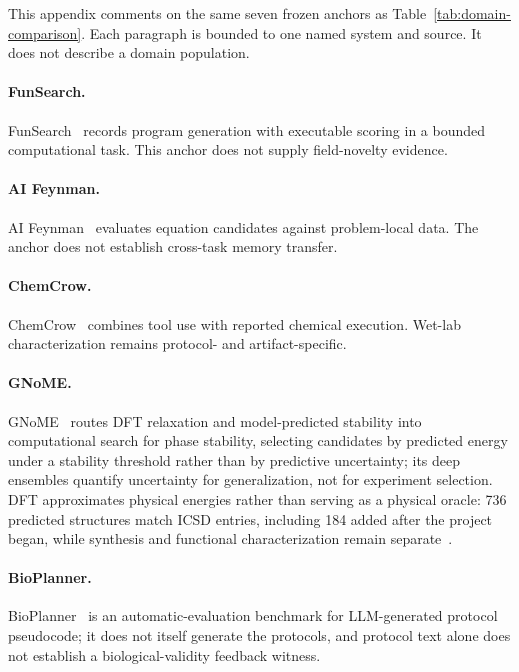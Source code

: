\documentclass{article}
\begin{document}
This appendix comments on the same seven frozen anchors as Table~\ref{tab:domain-comparison}. Each paragraph is bounded to one named system and source. It does not describe a domain population.

\paragraph{FunSearch.} FunSearch~\citep{romera2023funsearch} records program generation with executable scoring in a bounded computational task. This anchor does not supply field-novelty evidence.

\paragraph{AI Feynman.} AI Feynman~\citep{udrescu2020afeynman} evaluates equation candidates against problem-local data. The anchor does not establish cross-task memory transfer.

\paragraph{ChemCrow.} ChemCrow~\citep{bran2023chemcrow} combines tool use with reported chemical execution. Wet-lab characterization remains protocol- and artifact-specific.

\paragraph{GNoME.} GNoME~\citep{merchant2023gnome} routes DFT relaxation and model-predicted stability into computational search for phase stability, selecting candidates by predicted energy under a stability threshold rather than by predictive uncertainty; its deep ensembles quantify uncertainty for generalization, not for experiment selection. DFT approximates physical energies rather than serving as a physical oracle: 736 predicted structures match ICSD entries, including 184 added after the project began, while synthesis and functional characterization remain separate~\citep{merchant2023gnome,cheetham2024gnome}.

\paragraph{BioPlanner.} BioPlanner~\citep{odonoghue2023bioplanner} is an automatic-evaluation benchmark for LLM-generated protocol pseudocode; it does not itself generate the protocols, and protocol text alone does not establish a biological-validity feedback witness.
\end{document}
